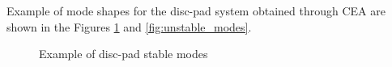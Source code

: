 Example of mode shapes for the disc-pad system obtained through CEA are shown in the Figures \ref{fig:stable_modes} and \ref{fig:unstable_modes}.\\

 \begin{figure}[h!]
    \centering
    \caption{Example of disc-pad stable modes}
    \label{fig:stable_modes}
\end{figure}

